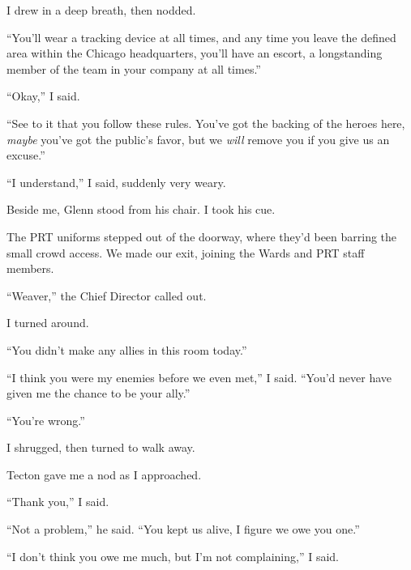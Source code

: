 I drew in a deep breath, then nodded.



``You'll wear a tracking device at all times, and any time you leave the defined area within the Chicago headquarters, you'll have an escort, a longstanding member of the team in your company at all times.''



``Okay,'' I said.



``See to it that you follow these rules.  You've got the backing of the heroes here, \emph{maybe} you've got the public's favor, but we \emph{will} remove you if you give us an excuse.''



``I understand,'' I said, suddenly very weary.



Beside me, Glenn stood from his chair.  I took his cue.



The PRT uniforms stepped out of the doorway, where they'd been barring the small crowd access.  We made our exit, joining the Wards and PRT staff members.



``Weaver,'' the Chief Director called out.



I turned around.



``You didn't make any allies in this room today.''



``I think you were my enemies before we even met,'' I said.  ``You'd never have given me the chance to be your ally.''



``You're wrong.''



I shrugged, then turned to walk away.



Tecton gave me a nod as I approached.



``Thank you,'' I said.



``Not a problem,'' he said.  ``You kept us alive, I figure we owe you one.''



``I don't think you owe me much, but I'm not complaining,'' I said.



